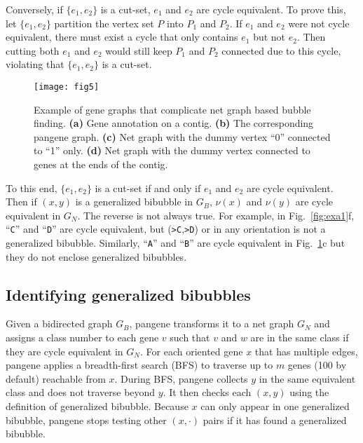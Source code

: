 \documentclass[webpdf,contemporary,large,namedate]{oup-authoring-template}%
\begin{document}
Conversely, if $\{e_1,e_2\}$ is a cut-set, $e_1$ and $e_2$ are cycle equivalent.
To prove this, let $\{e_1,e_2\}$ partition the vertex set $P$ into $P_1$ and $P_2$.
If $e_1$ and $e_2$ were not cycle equivalent, there must exist a cycle that only contains $e_1$ but not $e_2$.
Then cutting both $e_1$ and $e_2$ would still keep $P_1$ and $P_2$ connected due to this cycle,
violating that $\{e_1,e_2\}$ is a cut-set.

\begin{figure}[t!]
\centering
\texttt{[image: fig5]}
\caption{Example of gene graphs that complicate net graph based bubble finding.
{\bf (a)} Gene annotation on a contig.
{\bf (b)} The corresponding pangene graph.
{\bf (c)} Net graph with the dummy vertex ``0'' connected to ``1'' only.
{\bf (d)} Net graph with the dummy vertex connected to genes at the ends of the contig.
}\label{fig:complex}
\end{figure}

To this end, $\{e_1,e_2\}$ is a cut-set if and only if $e_1$ and $e_2$ are cycle equivalent.
Then if $(x,y)$ is a generalized bibubble in $G_B$,
$\nu(x)$ and $\nu(y)$ are cycle equivalent in $G_N$.
The reverse is not always true.
For example, in Fig.~\ref{fig:exa1}f, ``{\tt C}'' and ``{\tt D}'' are cycle equivalent,
but ({\tt >C},{\tt >D}) or in any orientation is not a generalized bibubble.
Similarly, ``{\tt A}'' and ``{\tt B}'' are cycle equivalent in Fig.~\ref{fig:complex}c but they do not enclose generalized bibubbles.


\subsection{Identifying generalized bibubbles}

Given a bidirected graph $G_B$, pangene transforms it to a net graph $G_N$
and assigns a class number to each gene $v$ such that $v$ and $w$ are in the same class if they are cycle equivalent in $G_N$.
For each oriented gene $x$ that has multiple edges,
pangene applies a breadth-first search (BFS) to traverse up to $m$ genes (100 by default) reachable from $x$.
During BFS, pangene collects $y$ in the same equivalent class and does not traverse beyond $y$.
It then checks each $(x,y)$ using the definition of generalized bibubble.
Because $x$ can only appear in one generalized bibubble, pangene stops testing other $(x,\cdot)$ pairs
if it has found a generalized bibubble.
\end{document}
